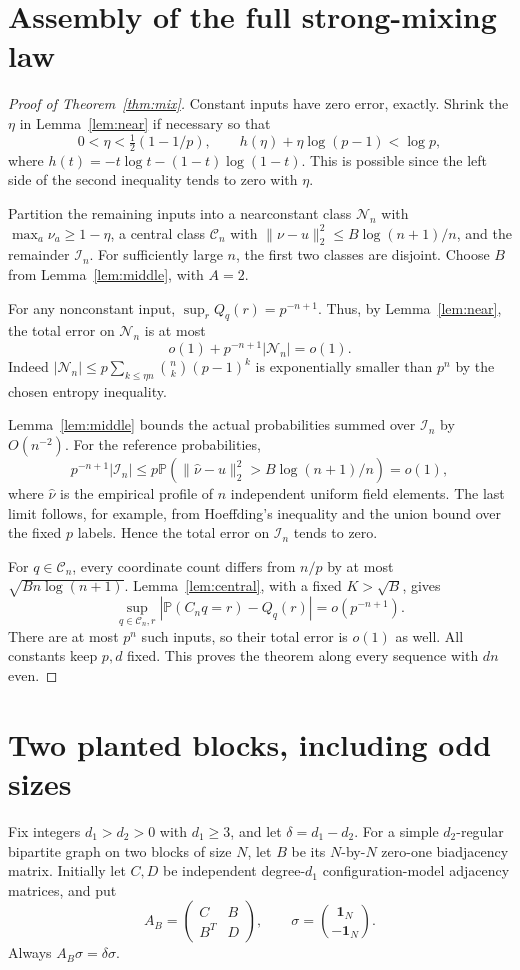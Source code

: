 \documentclass[11pt]{article}
\newcommand{\one}{\mathbf1}
\newcommand{\Prob}{\mathbb P}
\begin{document}
\section{Assembly of the full strong-mixing law}
\begin{proof}[Proof of Theorem~\ref{thm:mix}]
Constant inputs have zero error, exactly. Shrink the $\eta$ in
Lemma~\ref{lem:near} if necessary so that
\[
 0<\eta<\tfrac12(1-1/p),\qquad
 h(\eta)+\eta\log(p-1)<\log p,
\]
where $h(t)=-t\log t-(1-t)\log(1-t)$. This is possible since the
left side of the second inequality tends to zero with $\eta$.

Partition the remaining inputs into a nearconstant class
$\mathcal N_n$ with $\max_a\nu_a\ge1-\eta$, a central class
$\mathcal C_n$ with
$\|\nu-u\|_2^2\le B\log(n+1)/n$, and the remainder
$\mathcal I_n$. For sufficiently large $n$, the first two classes are
disjoint. Choose $B$ from Lemma~\ref{lem:middle}, with $A=2$.

For any nonconstant input, $\sup_r Q_q(r)=p^{-n+1}$. Thus, by
Lemma~\ref{lem:near}, the total error on $\mathcal N_n$ is at most
\[
 o(1)+p^{-n+1}|\mathcal N_n|=o(1).
\]
Indeed $|\mathcal N_n|\le p\sum_{k\le\eta n}\binom nk(p-1)^k$
is exponentially smaller than $p^n$ by the chosen entropy inequality.

Lemma~\ref{lem:middle} bounds the actual probabilities summed over
$\mathcal I_n$ by $O(n^{-2})$. For the reference probabilities,
\[
 p^{-n+1}|\mathcal I_n|
 \le p\Prob\!\left(\|\widehat\nu-u\|_2^2>
                       B\log(n+1)/n\right)=o(1),
\]
where $\widehat\nu$ is the empirical profile of $n$ independent
uniform field elements. The last limit follows, for example, from
Hoeffding's inequality and the union bound over the fixed $p$ labels.
Hence the total error on $\mathcal I_n$ tends to zero.

For $q\in\mathcal C_n$, every coordinate count differs from $n/p$
by at most $\sqrt{Bn\log(n+1)}$. Lemma~\ref{lem:central}, with a
fixed $K>\sqrt B$, gives
\[
 \sup_{q\in\mathcal C_n,r}
       |\Prob(C_nq=r)-Q_q(r)|=o(p^{-n+1}).
\]
There are at most $p^n$ such inputs, so their total error is $o(1)$
as well. All constants keep $p,d$ fixed. This proves the theorem
along every sequence with $dn$ even.
\end{proof}

\section{Two planted blocks, including odd sizes}
Fix integers $d_1>d_2>0$ with $d_1\ge3$, and let
$\delta=d_1-d_2$. For a simple $d_2$-regular bipartite graph on two
blocks of size $N$, let $B$ be its $N$-by-$N$ zero-one biadjacency
matrix. Initially let $C,D$ be independent degree-$d_1$
configuration-model adjacency matrices, and put
\[
 A_B=\begin{pmatrix}C&B\\B^T&D\end{pmatrix},\qquad
 \sigma=\binom{\one_N}{-\one_N}.
\]
Always $A_B\sigma=\delta\sigma$.
\end{document}
